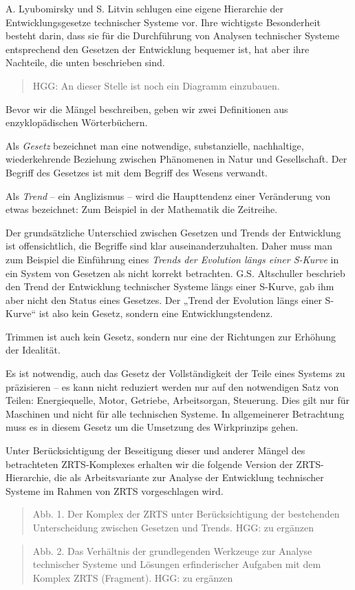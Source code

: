 \documentclass[11pt,a4paper]{article}
\begin{document}
A. Lyubomirsky und S. Litvin schlugen eine eigene Hierarchie der
Entwicklungsgesetze technischer Systeme vor. Ihre wichtigste Besonderheit
besteht darin, dass sie für die Durchführung von Analysen technischer Systeme
entsprechend den Gesetzen der Entwicklung bequemer ist, hat aber ihre
Nachteile, die unten beschrieben sind.
\begin{quote}
  HGG: An dieser Stelle ist noch ein Diagramm einzubauen.
\end{quote}
Bevor wir die Mängel beschreiben, geben wir zwei Definitionen aus
enzyklopädischen Wörter\-büchern.

Als \emph{Gesetz} bezeichnet man eine notwendige, substanzielle, nachhaltige,
wiederkehrende Beziehung zwischen Phänomenen in Natur und Gesellschaft. Der
Begriff des Gesetzes ist mit dem Begriff des Wesens verwandt.

Als \emph{Trend} -- ein Anglizismus -- wird die Haupttendenz einer Veränderung
von etwas bezeichnet: Zum Beispiel in der Mathematik die Zeitreihe.

Der grundsätzliche Unterschied zwischen Gesetzen und Trends der Entwicklung
ist offensichtlich, die Begriffe sind klar auseinanderzuhalten. Daher muss man
zum Beispiel die Einführung eines \emph{Trends der Evolution längs einer
  S-Kurve} in ein System von Gesetzen als nicht korrekt betrachten.
G.S. Altschuller beschrieb den Trend der Entwicklung technischer Systeme längs
einer S-Kurve, gab ihm aber nicht den Status eines Gesetzes. Der „Trend der
Evolution längs einer S-Kurve“ ist also kein Gesetz, sondern eine
Entwicklungstendenz.

Trimmen ist auch kein Gesetz, sondern nur eine der Richtungen zur Erhöhung der
Idealität.

Es ist notwendig, auch das Gesetz der Vollständigkeit der Teile eines Systems
zu präzisieren -- es kann nicht reduziert werden nur auf den notwendigen Satz
von Teilen: Energiequelle, Motor, Getriebe, Arbeitsorgan, Steuerung. Dies gilt
nur für Maschinen und nicht für alle technischen Systeme. In allgemeinerer
Betrachtung muss es in diesem Gesetz um die Umsetzung des Wirkprinzips gehen.

Unter Berücksichtigung der Beseitigung dieser und anderer Mängel des
betrachteten ZRTS-Komplexes erhalten wir die folgende Version der
ZRTS-Hierarchie, die als Arbeitsvariante zur Analyse der Entwicklung
technischer Systeme im Rahmen von ZRTS vorgeschlagen wird.

\begin{quote}
  Abb. 1. Der Komplex der ZRTS unter Berücksichtigung der bestehenden
  Unterscheidung zwischen Gesetzen und Trends. HGG: zu ergänzen
\end{quote}
\begin{quote}
  Abb. 2. Das Verhältnis der grundlegenden Werkzeuge zur Analyse technischer
  Systeme und Lösungen erfinderischer Aufgaben mit dem Komplex ZRTS
  (Fragment). HGG: zu ergänzen
\end{quote}
\end{document}
